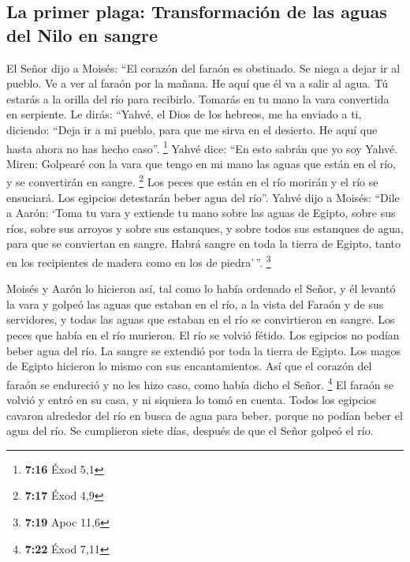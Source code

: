 \hypertarget{la-primer-plaga-transformaciuxf3n-de-las-aguas-del-nilo-en-sangre}{%
\subsection{La primer plaga: Transformación de las aguas del Nilo en
sangre}\label{la-primer-plaga-transformaciuxf3n-de-las-aguas-del-nilo-en-sangre}}

 El Señor dijo a Moisés: ``El corazón del faraón es
obstinado. Se niega a dejar ir al pueblo.  Ve a ver al
faraón por la mañana. He aquí que él va a salir al agua. Tú estarás a la
orilla del río para recibirlo. Tomarás en tu mano la vara convertida en
serpiente.  Le dirás: ``Yahvé, el Dios de los hebreos, me
ha enviado a ti, diciendo: ``Deja ir a mi pueblo, para que me sirva en
el desierto. He aquí que hasta ahora no has hecho caso''. \footnote{\textbf{7:16}
  Éxod 5,1}  Yahvé dice: ``En esto sabrán que yo soy
Yahvé. Miren: Golpearé con la vara que tengo en mi mano las aguas que
están en el río, y se convertirán en sangre. \footnote{\textbf{7:17}
  Éxod 4,9}  Los peces que están en el río morirán y el
río se ensuciará. Los egipcios detestarán beber agua del río''.
 Yahvé dijo a Moisés: ``Dile a Aarón: `Toma tu vara y
extiende tu mano sobre las aguas de Egipto, sobre sus ríos, sobre sus
arroyos y sobre sus estanques, y sobre todos sus estanques de agua, para
que se conviertan en sangre. Habrá sangre en toda la tierra de Egipto,
tanto en los recipientes de madera como en los de piedra'\,''.
\footnote{\textbf{7:19} Apoc 11,6}

 Moisés y Aarón lo hicieron así, tal como lo había
ordenado el Señor, y él levantó la vara y golpeó las aguas que estaban
en el río, a la vista del Faraón y de sus servidores, y todas las aguas
que estaban en el río se convirtieron en sangre.  Los
peces que había en el río murieron. El río se volvió fétido. Los
egipcios no podían beber agua del río. La sangre se extendió por toda la
tierra de Egipto.  Los magos de Egipto hicieron lo mismo
con sus encantamientos. Así que el corazón del faraón se endureció y no
les hizo caso, como había dicho el Señor. \footnote{\textbf{7:22} Éxod
  7,11}  El faraón se volvió y entró en su casa, y ni
siquiera lo tomó en cuenta.  Todos los egipcios cavaron
alrededor del río en busca de agua para beber, porque no podían beber el
agua del río.  Se cumplieron siete días, después de que
el Señor golpeó el río.

